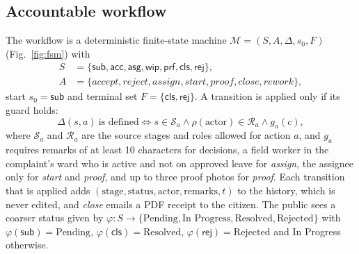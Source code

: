 \documentclass[conference]{IEEEtran}
\begin{document}
\subsection{Accountable workflow}\label{sec:wf}
The workflow is a deterministic finite-state machine $\mathcal{M}=(S,A,\Delta,s_0,F)$ (Fig.~\ref{fig:fsm}) with
\begin{align*}
S&=\{\textsf{sub},\textsf{acc},\textsf{asg},\textsf{wip},\textsf{prf},\textsf{cls},\textsf{rej}\},\\
A&=\{\textit{accept},\textit{reject},\textit{assign},\textit{start},\textit{proof},\textit{close},\textit{rework}\},
\end{align*}
start $s_0=\textsf{sub}$ and terminal set $F=\{\textsf{cls},\textsf{rej}\}$. A transition is applied only if its guard holds:
\begin{equation}
\Delta(s,a)\ \text{is defined} \iff s\in\mathcal{S}_a \wedge \rho(\text{actor})\in\mathcal{R}_a \wedge g_a(c),
\label{eq:fsm}
\end{equation}
where $\mathcal{S}_a$ and $\mathcal{R}_a$ are the source stages and roles allowed for action $a$, and $g_a$ requires remarks of at least 10 characters for decisions, a field worker in the complaint's ward who is active and not on approved leave for \textit{assign}, the assignee only for \textit{start} and \textit{proof}, and up to three proof photos for \textit{proof}. Each transition that is applied adds $(\text{stage},\text{status},\text{actor},\text{remarks},t)$ to the history, which is never edited, and \textit{close} emails a PDF receipt to the citizen. The public sees a coarser status given by $\varphi:S\to\{\text{Pending},\text{In Progress},\text{Resolved},\text{Rejected}\}$ with $\varphi(\textsf{sub})=\text{Pending}$, $\varphi(\textsf{cls})=\text{Resolved}$, $\varphi(\textsf{rej})=\text{Rejected}$ and In Progress otherwise.
\end{document}
